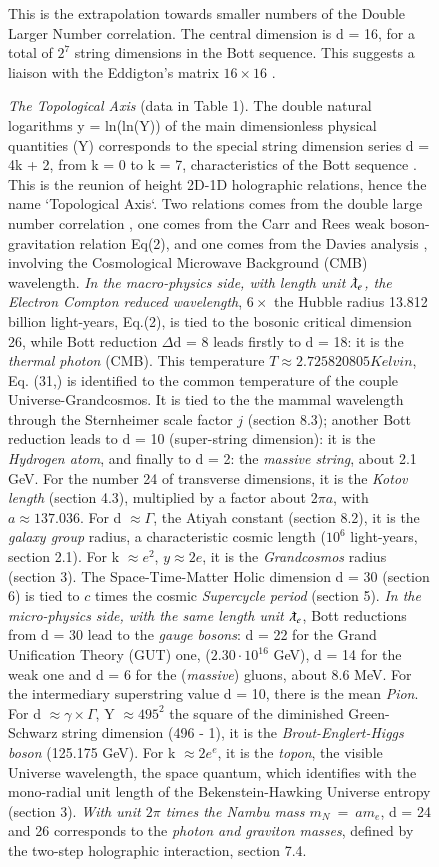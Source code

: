 \documentclass[twoside,draft]{article}
\begin{document}
\begin{sloppypar}
\begin{figure}
\caption{\textit{The Topological Axis} (data in Table 1). The double natural logarithms y = ln(ln(Y)) of the main dimensionless physical quantities (Y) corresponds to the special string dimension series d = 4k + 2, from k = 0 to k = 7, characteristics of the Bott sequence \cite{Cartan}. This is the reunion of height 2D-1D holographic relations, hence the name `Topological Axis`. Two relations comes from the double large number correlation \cite{Eddington}, one comes from the Carr and Rees weak boson-gravitation relation Eq(2), and one comes from the Davies analysis \cite{Davies}, involving the Cosmological Microwave Background (CMB) wavelength. \textit{In the macro-physics side, with length unit $\lambdabar_e$, the Electron Compton reduced wavelength}, $6 \times$ the Hubble radius 13.812 billion light-years, Eq.(2), is tied to the bosonic critical dimension 26, while Bott reduction $\Delta$d = 8 leads firstly to  d = 18: it is the \textit{thermal photon} (CMB). This temperature $T \approx 2.725820805 Kelvin$, Eq. (31,) is identified to the common temperature of the couple Universe-Grandcosmos. It is tied to the the mammal wavelength through the Sternheimer scale factor $j$ (section 8.3); another Bott reduction leads to d = 10 (super-string dimension): it is the \textit{Hydrogen atom}, and finally to d = 2: the \textit{massive string}, about 2.1 GeV. For the number 24 of transverse dimensions, it is the \textit{Kotov length} (section 4.3), multiplied by a factor about 2$\pi a$, with $a \approx 137.036$. For d $\approx \Gamma$, the Atiyah constant (section 8.2), it is the \textit{galaxy group} radius, a characteristic cosmic length ($10^{6}$ light-years, section 2.1). For k $\approx e^{2}$, $y \approx 2e$, it is the \textit{Grandcosmos} radius (section 3). 
The Space-Time-Matter Holic dimension d = 30 (section 6) is tied to $c$ times the cosmic \textit{Supercycle period} (section 5). 
\textit{In the micro-physics side, with the same length unit $\lambdabar_e$}, Bott reductions from d = 30 lead to the \textit{gauge bosons}: d = 22 for the Grand Unification Theory (GUT) one, ($ 2.30\cdot10^{16}$ GeV), d = 14 for the weak one and d = 6 for the (\textit{massive}) gluons, about 8.6 MeV.
For the intermediary superstring value d = 10, there is the mean \textit{Pion}. For d $\approx \gamma \times \Gamma$, Y $\approx 495^2$ the square of the diminished Green-Schwarz string dimension (496 - 1), it is the \textit{Brout-Englert-Higgs boson} (125.175 GeV). For k $\approx 2e^e$, it is the \textit{topon}, the visible Universe wavelength, the space quantum, which identifies with the mono-radial unit length of the Bekenstein-Hawking Universe entropy (section 3).
   \textit{With unit $2\pi$ times the Nambu mass $m_N~=~am_e$}\cite{Nambu}, d = 24 and 26 corresponds to the \textit{photon and graviton masses}, defined by the two-step holographic interaction\cite{Sanchez1}, section 7.4.}
This is the extrapolation towards smaller numbers of the Double Larger Number correlation.
The central dimension is d = 16, for a total of $2^7$ string dimensions in the Bott sequence.
This suggests a liaison with the Eddigton's matrix $16 \times 16$ \cite{Eddington}. 
    

\end{figure}
\end{sloppypar}
\end{document}
